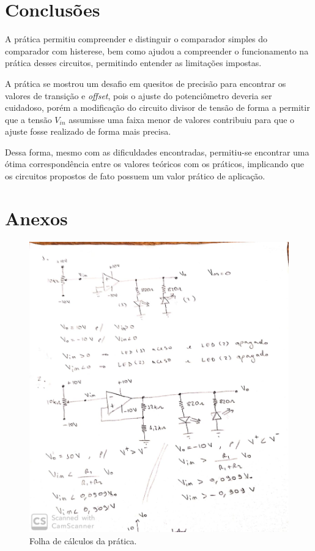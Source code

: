 \section{Conclusões}

A prática permitiu compreender e distinguir o comparador simples do comparador com histerese, bem como ajudou a compreender o funcionamento na prática desses circuitos, permitindo entender as limitações impostas. 

A prática se mostrou um desafio em quesitos de precisão para encontrar os valores de transição e \textit{offset}, pois o ajuste do potenciômetro deveria ser cuidadoso, porém a modificação do circuito divisor de tensão de forma a permitir que a tensão $V_{in}$ assumisse uma faixa menor de valores contribuiu para que o ajuste fosse realizado de forma mais precisa.

Dessa forma, mesmo com as dificuldades encontradas, permitiu-se encontrar uma ótima correspondência entre os valores teóricos com os práticos, implicando que os circuitos propostos de fato possuem um valor prático de aplicação.


\section{Anexos}

\begin{figure}[H] 
\includegraphics[scale=0.4]{images/calc.jpeg} 
\centering
\caption{Folha de cálculos da prática.}
\label{p5-2} 
\end{figure} 

